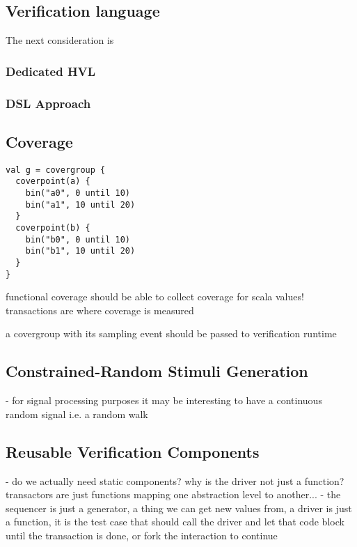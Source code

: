 \documentclass[11pt]{report}
\begin{document}
\subsection{Verification language} %
The next consideration is

\subsubsection{Dedicated HVL}

\subsubsection{DSL Approach}

\subsection{Coverage} %

\begin{lstlisting}
val g = covergroup {
  coverpoint(a) {
    bin("a0", 0 until 10)
    bin("a1", 10 until 20)
  }
  coverpoint(b) {
    bin("b0", 0 until 10)
    bin("b1", 10 until 20)
  }
}
\end{lstlisting}

functional coverage should be able to collect coverage for scala values! transactions are where coverage is measured

a covergroup with its sampling event should be passed to verification runtime

\subsection{Constrained-Random Stimuli Generation} %

- for signal processing purposes it may be interesting to have a continuous random signal i.e. a random walk

\subsection{Reusable Verification Components} %

- do we actually need static components? why is the driver not just a function? transactors are just functions
mapping one abstraction level to another...
- the sequencer is just a generator, a thing we can get new values from, a driver is just a function, it is the test
case that should call the driver and let that code block until the transaction is done, or fork the interaction to continue
\end{document}
